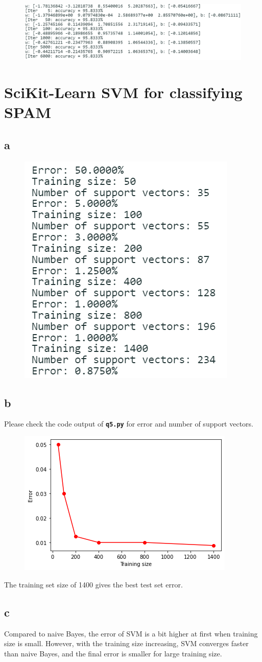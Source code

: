 \documentclass{article}
\begin{document}
\begin{figure}[htbp]
    \centering
    \includegraphics[width=.8\textwidth]{q4e.png}
\end{figure}

\newpage

\section{SciKit-Learn SVM for classifying SPAM}

\subsection*{a}

\begin{figure}[htbp]
    \centering
    \includegraphics[width=.3\textwidth]{q5a.png}
\end{figure}

\subsection*{b}

Please check the code output of \textbf{\texttt{q5.py}} for error and number of support vectors.

\begin{figure}[htbp]
    \centering
    \includegraphics[width=.6\textwidth]{q5.png}
\end{figure}
The training set size of 1400 gives the best test set error.

\subsection*{c}

Compared to naive Bayes, the error of SVM is a bit higher at first when training size is small. However, with the training size increasing, SVM converges faster than naive Bayes, and the final error is smaller for large training size.
 
\end{document}
